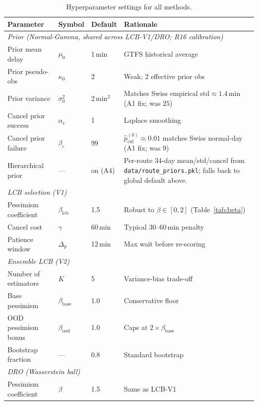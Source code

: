 \documentclass[11pt]{article}
\theoremstyle{definition}
\theoremstyle{remark}
\begin{document}
\begin{table}[h]
\centering
\caption{Hyperparameter settings for all methods.}
\label{tab:params}
\scriptsize
\setlength{\tabcolsep}{3pt}
\begin{tabular}{l l l p{6.0cm}}
\toprule
\textbf{Parameter} & \textbf{Symbol} & \textbf{Default} & \textbf{Rationale} \\
\midrule
\multicolumn{4}{l}{\textit{Prior (Normal-Gamma, shared across LCB-V1/DRO; R16 calibration)}} \\
Prior mean delay     & $\mu_0$      & 1\,min  & GTFS historical average \\
Prior pseudo-obs     & $\kappa_0$   & 2       & Weak; 2 effective prior obs \\
Prior variance       & $\sigma_0^2$ & 2\,min$^2$  & Matches Swiss empirical std$\approx 1.4$\,min (A1 fix; was $25$) \\
Cancel prior success & $\alpha_c$   & 1       & Laplace smoothing \\
Cancel prior failure & $\beta_c$    & 99      & $\hat{p}_{\mathrm{cxl}}^{(0)}\!\approx\!0.01$ matches Swiss normal-day (A1 fix; was $9$) \\
Hierarchical prior  & ---          & on (A4) & Per-route 34-day mean/std/cancel from \texttt{data/route\_priors.pkl}; falls back to global default above. \\
\midrule
\multicolumn{4}{l}{\textit{LCB selection (V1)}} \\
Pessimism coefficient & $\beta_{\mathrm{lcb}}$ & 1.5 & Robust to $\beta\in[0,2]$ (Table~\ref{tab:beta}) \\
Cancel cost           & $\gamma$    & 60\,min & Typical 30--60\,min penalty \\
Patience window       & $\Delta_p$  & 12\,min & Max wait before re-scoring \\
\midrule
\multicolumn{4}{l}{\textit{Ensemble LCB (V2)}} \\
Number of estimators  & $K$         & 5       & Variance-bias trade-off \\
Base pessimism        & $\beta_{\mathrm{base}}$ & 1.0 & Conservative floor \\
OOD pessimism bonus   & $\beta_{\mathrm{ood}}$  & 1.0 & Caps at $2\times\beta_{\mathrm{base}}$ \\
Bootstrap fraction    & ---         & 0.8     & Standard bootstrap \\
\midrule
\multicolumn{4}{l}{\textit{DRO (Wasserstein ball)}} \\
Pessimism coefficient & $\beta$     & 1.5     & Same as LCB-V1 \\

\end{tabular}
\end{table}
\end{document}

